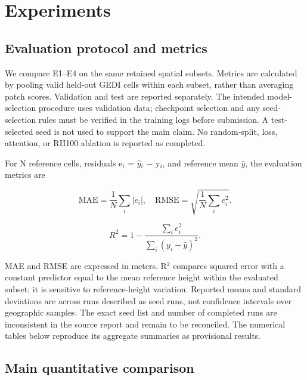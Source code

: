 \section{Experiments}

\subsection{Evaluation protocol and metrics}

We compare E1--E4 on the same retained spatial subsets. Metrics are calculated by pooling valid held-out GEDI cells within each subset, rather than averaging patch scores. Validation and test are reported separately. The intended model-selection procedure uses validation data; checkpoint selection and any seed-selection rules must be verified in the training logs before submission. A test-selected seed is not used to support the main claim. No random-split, loss, attention, or RH100 ablation is reported as completed.

For N reference cells, residuals e$_i$ = $\hat{y}$$_i$ $-$ y$_i$, and reference mean $\bar{y}$, the evaluation metrics are

\begin{equation} \mathrm{MAE}=\frac{1}{N}\sum_i |e_i|,\quad \mathrm{RMSE}=\sqrt{\frac{1}{N}\sum_i e_i^2}. \end{equation}

\begin{equation} R^2=1-\frac{\sum_i e_i^2}{\sum_i(y_i-\bar{y})^2}. \end{equation}

MAE and RMSE are expressed in meters. R$^2$ compares squared error with a constant predictor equal to the mean reference height within the evaluated subset; it is sensitive to reference-height variation. Reported means and standard deviations are across runs described as seed runs, not confidence intervals over geographic samples. The exact seed list and number of completed runs are inconsistent in the source report and remain to be reconciled. The numerical tables below reproduce its aggregate summaries as provisional results.

\subsection{Main quantitative comparison}


